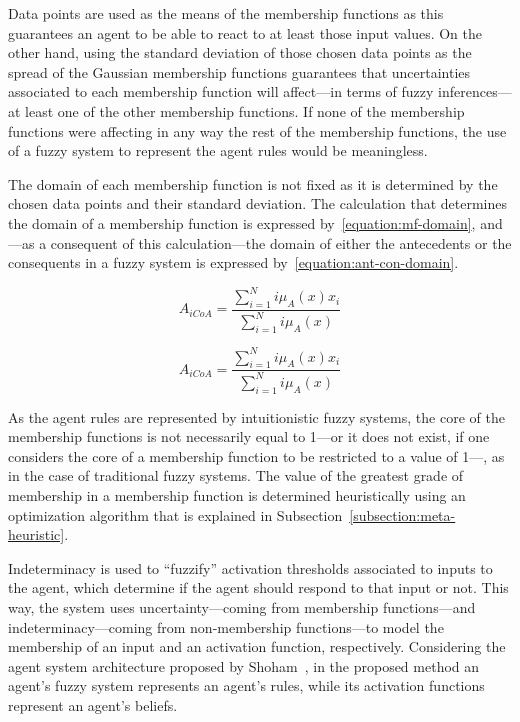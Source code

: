 \documentclass{ieeeaccess}
\begin{document}
Data points are used as the means of the membership functions as this guarantees
an agent to be able to react to at least those input values. On the other hand,
using the standard deviation of those chosen data points as the spread of the
Gaussian membership functions guarantees that uncertainties associated to each
membership function will affect---in terms of fuzzy inferences---at least one of
the other membership functions. If none of the membership functions were
affecting in any way the rest of the membership functions, the use of a fuzzy
system to represent the agent rules would be meaningless.

The domain of each membership function is not fixed as it is determined by the
chosen data points and their standard deviation. The calculation that determines
the domain of a membership function is expressed by~\ref{equation:mf-domain}, and---as a consequent of this
calculation---the domain of either the antecedents or the consequents in a fuzzy
system is expressed by~\ref{equation:ant-con-domain}. %


\begin{equation}
  \label{equation:mf-domain}
  A_{iCoA} = \dfrac{\sum_{i=1}^{N} i\mu_{A}(x) x_{i}}{\sum_{i=1}^{N}
    i\mu_{A}(x)}
\end{equation}

\begin{equation}
  \label{equation:ant-con-domain}
  A_{iCoA} = \dfrac{\sum_{i=1}^{N} i\mu_{A}(x) x_{i}}{\sum_{i=1}^{N}
    i\mu_{A}(x)}
\end{equation}

As the agent rules are represented by intuitionistic fuzzy systems, the core of
the membership functions is not necessarily equal to 1---or it does not exist,
if one considers the core of a membership function to be restricted to a value
of 1---, as in the case of traditional fuzzy systems. The value of the greatest
grade of membership in a membership function is determined heuristically using
an optimization algorithm that is explained in
Subsection~\ref{subsection:meta-heuristic}.

Indeterminacy is used to ``fuzzify'' activation thresholds associated to inputs
to the agent, which determine if the agent should respond to that input or
not. This way, the system uses uncertainty---coming from membership
functions---and indeterminacy---coming from non-membership functions---to model
the membership of an input and an activation function,
respectively. Considering the agent system architecture proposed by
Shoham~\cite{Shoham1993}, in the proposed method an agent's fuzzy system
represents an agent's rules, while its activation functions represent an
agent's beliefs.
\end{document}
